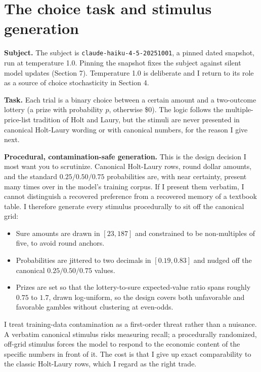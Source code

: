 \documentclass[11pt]{article}
\begin{document}
\section{The choice task and stimulus generation}

\textbf{Subject.} The subject is \texttt{claude-haiku-4-5-20251001}, a pinned dated snapshot, run
at temperature 1.0. Pinning the snapshot fixes the subject against silent model updates
(Section 7). Temperature 1.0 is deliberate and I return to its role as a source of choice
stochasticity in Section 4.

\textbf{Task.} Each trial is a binary choice between a certain amount and a two-outcome lottery
(a prize with probability $p$, otherwise \$0). The logic follows the multiple-price-list tradition
of Holt and Laury, but the stimuli are never presented in canonical Holt-Laury wording or with
canonical numbers, for the reason I give next.

\textbf{Procedural, contamination-safe generation.} This is the design decision I most want you to
scrutinize. Canonical Holt-Laury rows, round dollar amounts, and the standard $0.25 / 0.50 / 0.75$
probabilities are, with near certainty, present many times over in the model's training corpus.
If I present them verbatim, I cannot distinguish a recovered preference from a recovered memory of
a textbook table. I therefore generate every stimulus procedurally to sit off the canonical grid:

\begin{itemize}[leftmargin=1.4em]
\item Sure amounts are drawn in $[23, 187]$ and constrained to be non-multiples of five, to avoid
round anchors.
\item Probabilities are jittered to two decimals in $[0.19, 0.83]$ and nudged off the canonical
$0.25 / 0.50 / 0.75$ values.
\item Prizes are set so that the lottery-to-sure expected-value ratio spans roughly $0.75$ to
$1.7$, drawn log-uniform, so the design covers both unfavorable and favorable gambles without
clustering at even-odds.
\end{itemize}

I treat training-data contamination as a first-order threat rather than a nuisance. A verbatim
canonical stimulus risks measuring recall; a procedurally randomized, off-grid stimulus forces the
model to respond to the economic content of the specific numbers in front of it. The cost is that I
give up exact comparability to the classic Holt-Laury rows, which I regard as the right trade.
\end{document}
